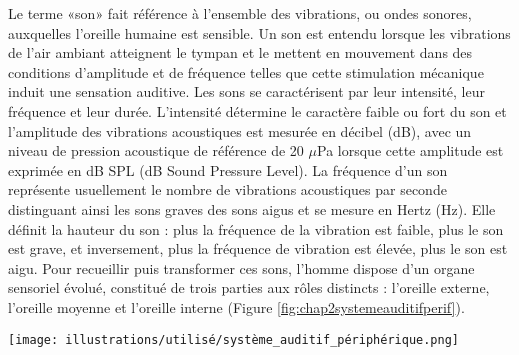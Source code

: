 Le terme «son» fait référence à l’ensemble des vibrations, ou ondes sonores, auxquelles l’oreille humaine est sensible. 
Un son est entendu lorsque les vibrations de l'air ambiant atteignent le tympan et le mettent en mouvement dans des conditions d'amplitude et de fréquence telles que cette stimulation mécanique induit une sensation auditive. 
Les sons se caractérisent par leur intensité, leur fréquence et leur durée. 
L'intensité détermine le caractère faible ou fort du son et l'amplitude des vibrations acoustiques est mesurée en décibel (dB), avec un niveau de pression acoustique de référence de 20 $\mu$Pa lorsque cette amplitude est exprimée en dB SPL (dB Sound Pressure Level). 
La fréquence d'un son représente usuellement le nombre de vibrations acoustiques par seconde distinguant ainsi les sons graves des sons aigus et se mesure en Hertz (Hz). 
Elle définit la hauteur du son : plus la fréquence de la vibration est faible, plus le son est grave, et inversement, plus la fréquence de vibration est élevée, plus le son est aigu. 
Pour recueillir puis transformer ces sons, l’homme dispose d’un organe sensoriel évolué, constitué de trois parties aux rôles distincts : l'oreille externe, l'oreille moyenne et l'oreille interne (Figure \ref{fig:chap2systemeauditifperif}).

\begin{figure*}[!t]
\center
\texttt{[image: illustrations/utilisé/système\_auditif\_périphérique.png]}
\caption[Système Auditif Périphérique]{Système Auditif Périphérique. L’homme dispose d’un organe sensoriel évolué, constitué de trois parties aux rôles distincts : l'oreille externe (OE), l'oreille moyenne (OM) et l'oreille interne (OI). Adapté de Kristen Wienandt Marzeion - Medical Illustration Sourcebook.}
\label{fig:chap2systemeauditifperif}
\end{figure*}

